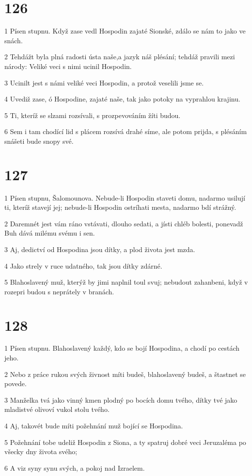 \chapter{126}

\par 1 Písen stupnu. Když zase vedl Hospodin zajaté Sionské, zdálo se nám to jako ve snách.
\par 2 Tehdážt byla plná radosti ústa naše,a jazyk náš plésání; tehdáž pravili mezi národy: Veliké veci s nimi ucinil Hospodin.
\par 3 Ucinilt jest s námi veliké veci Hospodin, a protož veselili jsme se.
\par 4 Uvediž zase, ó Hospodine, zajaté naše, tak jako potoky na vyprahlou krajinu.
\par 5 Ti, kteríž se slzami rozsívali, s prozpevováním žíti budou.
\par 6 Sem i tam chodící lid s plácem rozsívá drahé síme, ale potom prijda, s plésáním snášeti bude snopy své.

\chapter{127}

\par 1 Písen stupnu, Šalomounova. Nebude-li Hospodin staveti domu, nadarmo usilují ti, kteríž stavejí jej; nebude-li Hospodin ostríhati mesta, nadarmo bdí strážný.
\par 2 Daremnét jest vám ráno vstávati, dlouho sedati, a jísti chléb bolesti, ponevadž Buh dává milému svému i sen.
\par 3 Aj, dedictví od Hospodina jsou dítky, a plod života jest mzda.
\par 4 Jako strely v ruce udatného, tak jsou dítky zdárné.
\par 5 Blahoslavený muž, kterýž by jimi naplnil toul svuj; nebudout zahanbeni, když v rozepri budou s neprátely v branách.

\chapter{128}

\par 1 Písen stupnu. Blahoslavený každý, kdo se bojí Hospodina, a chodí po cestách jeho.
\par 2 Nebo z práce rukou svých živnost míti budeš, blahoslavený budeš, a štastnet se povede.
\par 3 Manželka tvá jako vinný kmen plodný po bocích domu tvého, dítky tvé jako mladistvé olivoví vukol stolu tvého.
\par 4 Aj, takovét bude míti požehnání muž bojící se Hospodina.
\par 5 Požehnání tobe udeliž Hospodin z Siona, a ty spatruj dobré veci Jeruzaléma po všecky dny života svého;
\par 6 A viz syny synu svých, a pokoj nad Izraelem.

